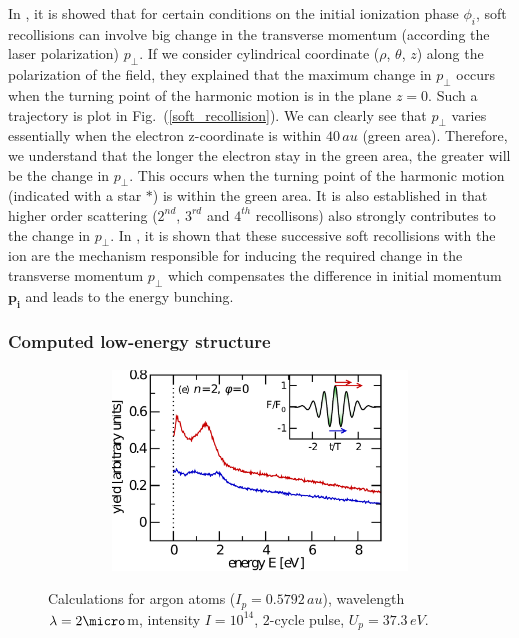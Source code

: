 \documentclass[a4paper]{article}
\begin{document}
In \cite{Liu_2010}, it is showed that for certain conditions on the initial ionization phase $\phi_{i}$, soft recollisions can involve big change in the transverse momentum (according the laser polarization) $p_{\perp}$. If we consider cylindrical coordinate ($\rho$, $\theta$, $z$) along the polarization of the field, they explained that the maximum change in $p_{\perp}$ occurs when the turning point of the harmonic motion is in the plane $z=0$. Such a trajectory is plot in Fig.~(\ref{soft_recollision}). We can clearly see that $p_{\perp}$ varies essentially when the electron z-coordinate is within $40\,au$ (green area). Therefore, we understand that the longer the electron stay in the green area, the greater will be the change in $p_{\perp}$. This occurs when the turning point of the harmonic motion (indicated with a star $*$) is within the green area. It is also established in \cite{Liu_2010} that higher order scattering ($2^{nd}$, $3^{rd}$ and $4^{th}$ recollisons) also strongly contributes to the change in $p_{\perp}$. In \cite{Kastner_2012_soft}, it is shown that these successive soft recollisions with the ion are the mechanism responsible for inducing the required change in the transverse momentum $p_{\perp}$ which compensates the difference in initial momentum $\mathbf{p_{i}}$ and leads to the energy bunching.

\subsubsection{Computed low-energy structure}

\begin{figure}[htp]
\begin{subfigure} [t]{0.49\textwidth}
\hspace{-1cm}
 \includegraphics[width=1.2\textwidth, height=201px]{data/kastner.pdf}
 \label{KastnerLES} 
\end{subfigure}
\begin{subfigure} [t]{0.49\textwidth}
\hspace{-0.5cm}
  \raisebox{17px}{\resizebox{0.983\textwidth}{!}{}}
 \label{myLES} 
\end{subfigure}
 \caption{Calculations for argon atoms ($I_{p}=0.5792\,au$), wavelength $\lambda =2\micro$m, intensity $I=10^{14}$, $2$-cycle pulse,  $U_{p}=37.3\,eV$. \label{comparison_Kastner_LES}}
\end{figure}
\end{document}
